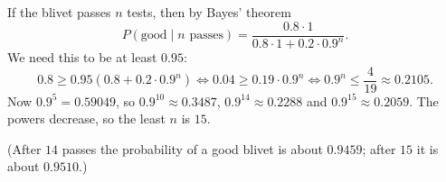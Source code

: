 If the blivet passes $n$ tests, then by Bayes' theorem
\[P(\text{good}\mid n\text{ passes})=\dfrac{0.8\cdot1}{0.8\cdot1+0.2\cdot0.9^n}.\]
We need this to be at least $0.95$:
\[0.8\ge0.95\left(0.8+0.2\cdot0.9^n\right)\iff 0.04\ge0.19\cdot0.9^n\iff 0.9^n\le\dfrac{4}{19}\approx0.2105 .\]
Now $0.9^{5}=0.59049$, so $0.9^{10}\approx0.3487$, $0.9^{14}\approx0.2288$ and $0.9^{15}\approx0.2059$. The powers decrease, so the least $n$ is $\boxed{15}$.

(After $14$ passes the probability of a good blivet is about $0.9459$; after $15$ it is about $0.9510$.)
